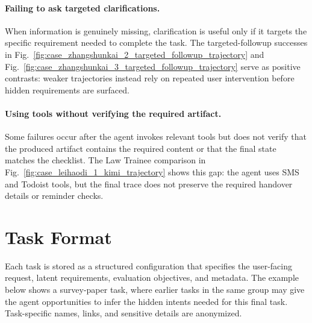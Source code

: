 \documentclass{llmxive}
\begin{document}
\paragraph{Failing to ask targeted clarifications.}
When information is genuinely missing, clarification is useful only if it targets the specific requirement needed to complete the task. The targeted-followup successes in Fig.~\ref{fig:case_zhangshunkai_2_targeted_followup_trajectory} and Fig.~\ref{fig:case_zhangshunkai_3_targeted_followup_trajectory} serve as positive contrasts: weaker trajectories instead rely on repeated user intervention before hidden requirements are surfaced.

\paragraph{Using tools without verifying the required artifact.}
Some failures occur after the agent invokes relevant tools but does not verify that the produced artifact contains the required content or that the final state matches the checklist. The Law Trainee comparison in Fig.~\ref{fig:case_leihaodi_1_kimi_trajectory} shows this gap: the agent uses SMS and Todoist tools, but the final trace does not preserve the required handover details or reminder checks.


\section{Task Format}
\label{app:task_format}

Each task is stored as a structured configuration that specifies the user-facing request, latent requirements, evaluation objectives, and metadata. The example below shows a survey-paper task, where earlier tasks in the same group may give the agent opportunities to infer the hidden intents needed for this final task. Task-specific names, links, and sensitive details are anonymized.
\end{document}
